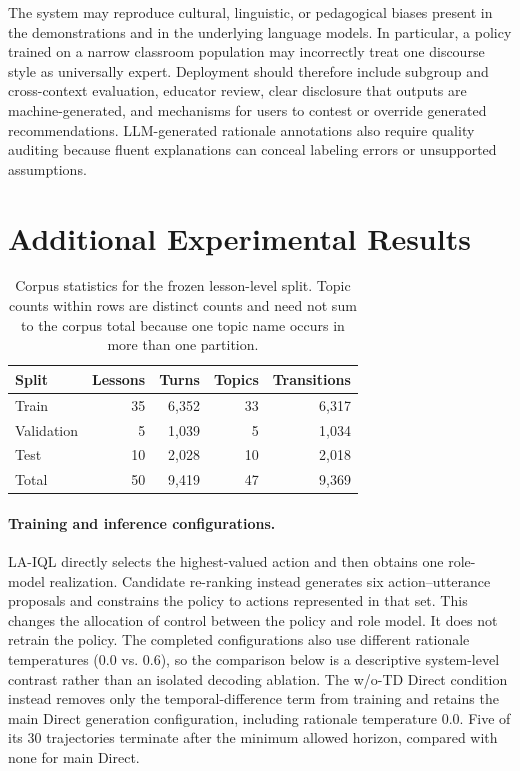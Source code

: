 \documentclass[manuscript,review,anonymous]{acmart}
\begin{document}
The system may reproduce cultural, linguistic, or pedagogical biases present in the demonstrations and in the underlying language models.
In particular, a policy trained on a narrow classroom population may incorrectly treat one discourse style as universally expert.
Deployment should therefore include subgroup and cross-context evaluation, educator review, clear disclosure that outputs are machine-generated, and mechanisms for users to contest or override generated recommendations.
LLM-generated rationale annotations also require quality auditing because fluent explanations can conceal labeling errors or unsupported assumptions.




\clearpage
\appendix
\section{Additional Experimental Results}
\label{sec:additional-results}

\begin{table}[t]
\centering
\small
\setlength{\tabcolsep}{3pt}
\begin{tabular}{lrrrr}
\toprule
Split & Lessons & Turns & Topics & Transitions \\
\midrule
Train      & 35 & 6,352 & 33 & 6,317 \\
Validation & 5  & 1,039 & 5 & 1,034 \\
Test       & 10 & 2,028 & 10 & 2,018 \\
Total      & 50 & 9,419 & 47 & 9,369 \\
\bottomrule
\end{tabular}
\caption{Corpus statistics for the frozen lesson-level split. Topic counts
within rows are distinct counts and need not sum to the corpus total because
one topic name occurs in more than one partition.}
\label{tab:appendix-data-statistics}
\end{table}

\paragraph{Training and inference configurations.}
LA-IQL directly selects the highest-valued action and then obtains one
role-model realization. Candidate re-ranking instead generates six
action--utterance proposals and constrains the policy to actions represented in
that set. This changes the allocation of control between the policy and role
model. It does not retrain the policy. The completed configurations also use
different rationale temperatures (0.0 vs. 0.6), so the comparison below is a
descriptive system-level contrast rather than an isolated decoding ablation.
The w/o-TD Direct condition instead removes only the temporal-difference term
from training and retains the main Direct generation configuration, including
rationale temperature 0.0. Five of its 30 trajectories terminate after the
minimum allowed horizon, compared with none for main Direct.
\end{document}
